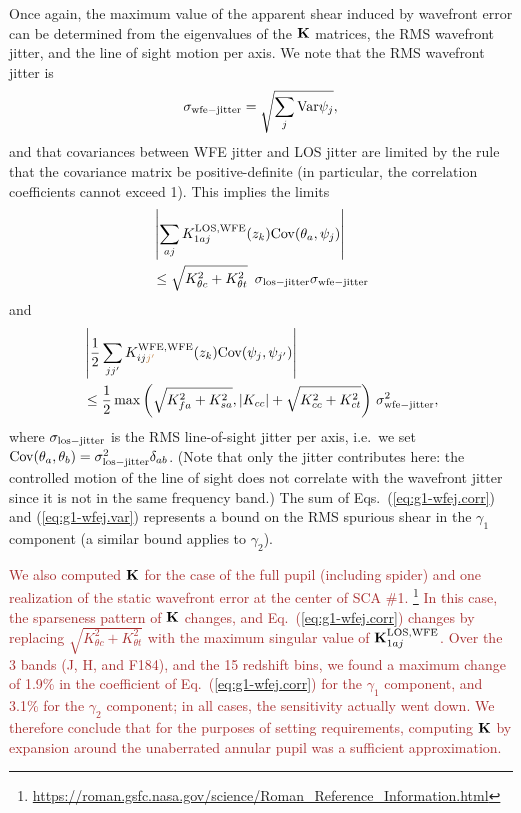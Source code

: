 \documentclass[usenatbib]{mnras}
\newcommand{\changetext}[1]{\textcolor{brown}{#1}}
\begin{document}
Once again, the maximum value of the apparent shear induced by
wavefront error can be determined from the eigenvalues of the ${\bf
K}$ matrices, the RMS wavefront jitter, and the line of sight motion
per axis. We note that the RMS wavefront jitter is
\begin{equation}
\sigma_{\rm wfe-jitter} = \sqrt{\sum_j {\rm Var} \psi_j},
\end{equation}
and that covariances between WFE jitter and LOS jitter are limited by the rule that the covariance matrix be positive-definite (in particular, the correlation coefficients cannot exceed 1). This implies the limits
\begin{align}
&\left|\sum_{aj} K^{\rm LOS,WFE}_{1aj}(z_k) {\rm
Cov}({\theta}_a,{\psi}_j)\right| \nonumber\\
&\le \sqrt{K_{\theta c}^2 + K_{\theta
t}^2}~\, \sigma_{\rm los-jitter} \sigma_{\rm wfe-jitter}
\label{eq:g1-wfej.corr}
\end{align}
and
\begin{align}
&\left|\frac12 \sum_{jj'} K^{\rm WFE,WFE}_{ij\changetext{j'}}(z_k) {\rm
Cov}({\psi}_j,{\psi}_{j'})\right| \nonumber\\
&\le \frac12 \max\left(
\sqrt{K_{fa}^2+K_{sa}^2}, |K_{cc}|+\sqrt{K_{cc}^2+K_{ct}^2}
\right)\,\sigma_{\rm wfe-jitter}^2,
\label{eq:g1-wfej.var}
\end{align}
where $\sigma_{\rm los-jitter}$ is the RMS line-of-sight jitter per
axis, i.e.\ we set ${\rm Cov}(\theta_a,\theta_b) = \sigma_{\rm
los-jitter}^2\delta_{ab}$. (Note that only the jitter contributes
here: the controlled motion of the line of sight does not correlate
with the wavefront jitter since it is not in the same frequency band.)
The sum of Eqs.~(\ref{eq:g1-wfej.corr}) and (\ref{eq:g1-wfej.var})
represents a bound on the RMS spurious shear in the $\gamma_1$
component (a similar bound applies to $\gamma_2$).

\changetext{We also computed ${\bf K}$ for the case of the full pupil (including spider) and one realization of the static wavefront error at the center of SCA \#1. \footnote{\url{https://roman.gsfc.nasa.gov/science/Roman\_Reference\_Information.html}} In this case, the sparseness pattern of ${\bf K}$ changes, and Eq.~(\ref{eq:g1-wfej.corr}) changes by replacing $\sqrt{K_{\theta c}^2 + K_{\theta t}^2}$ with the maximum singular value of ${\bf K}^{\rm LOS,WFE}_{1aj}$. Over the 3 bands (J, H, and F184), and the 15 redshift bins, we found a maximum change of 1.9\% in the coefficient of Eq.~(\ref{eq:g1-wfej.corr}) for the $\gamma_1$ component, and 3.1\% for the $\gamma_2$ component; in all cases, the sensitivity actually went down. We therefore conclude that for the purposes of setting requirements, computing ${\bf K}$ by expansion around the unaberrated annular pupil was a sufficient approximation.}
\end{document}
